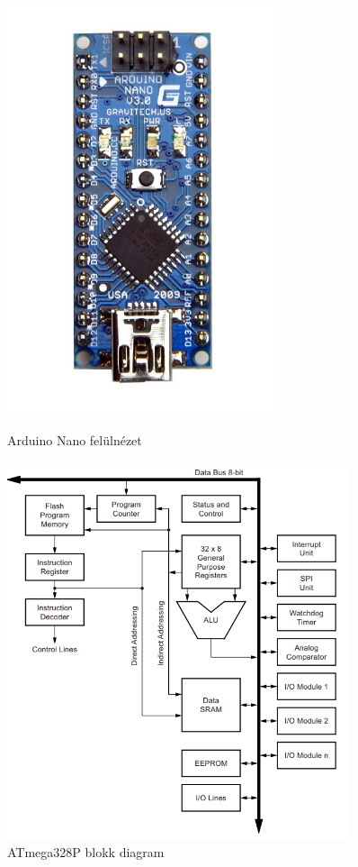 \documentclass[a4paper,12pt]{article}
\begin{document}
\begin{figure}[htp]
    \centering
    \begin{minipage}{0.45\textwidth}
        \centering
        \includegraphics[width=0.7\textwidth]{images/arduino_nano_overview.png}
        \caption[Arduino Nano felülnézet]{Arduino Nano felülnézet}
		\label{fig:arduino_nano_overview}
    \end{minipage}\hfill
    \begin{minipage}{0.45\textwidth}
        \centering
        \includegraphics[width=0.9\textwidth]{images/atmega328P_block_diagram.png}
        \caption[ATmega328P blokk diagram]{ATmega328P blokk diagram}
		\label{fig:atmega328P_block_diagram}
    \end{minipage}
\end{figure}
\end{document}
